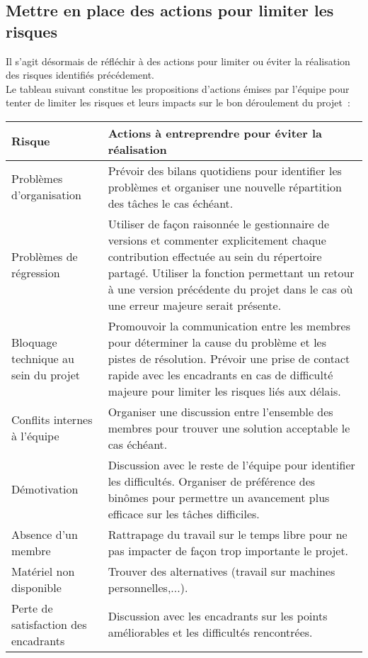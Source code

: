 \documentclass[a4paper,11pt]{article}
\begin{document}
\subsection{Mettre en place des actions pour limiter les risques}

Il s'agit désormais de réfléchir à des actions pour limiter ou éviter la réalisation des risques identifiés précédement.\\

Le tableau suivant constitue les propositions d'actions émises par l'équipe pour tenter de limiter les risques et leurs impacts sur le bon déroulement du projet~: \\
\hspace{-3cm}
\begin{tabular}{|p{4cm}||p{14cm}|}
\hline  
   Risque & Actions à entreprendre pour éviter la réalisation \\
\hline
\hline
   Problèmes d'organisation & Prévoir des bilans quotidiens pour 
identifier les problèmes et organiser une nouvelle répartition des tâches le cas échéant. \\
\hline
   Problèmes de régression & Utiliser de façon raisonnée le gestionnaire de versions et 
commenter explicitement chaque contribution effectuée au sein du répertoire partagé. Utiliser la fonction permettant un retour à une version précédente du projet dans le cas où une erreur majeure serait présente.\\
\hline
Bloquage technique au sein du projet & Promouvoir la communication entre les membres pour déterminer la cause du problème et les pistes de résolution. Prévoir une prise de contact rapide avec les encadrants en cas de difficulté majeure pour limiter les risques liés aux délais.\\
\hline
   Conflits internes à l'équipe & Organiser une discussion entre l'ensemble des membres pour trouver une solution acceptable le cas échéant.\\
\hline
   Démotivation & Discussion avec le reste de l'équipe pour identifier les difficultés. Organiser de préférence des binômes pour permettre un avancement plus efficace sur les tâches difficiles.\\
\hline
   Absence d'un membre & Rattrapage du travail sur le temps libre pour ne pas impacter de façon trop importante le projet.\\
\hline
   Matériel non disponible & Trouver des alternatives (travail sur machines personnelles,...).\\   
\hline
   Perte de satisfaction des encadrants & Discussion avec les encadrants sur les points améliorables et les difficultés rencontrées.\\ 

\hline
\end{tabular}\\
\end{document}
